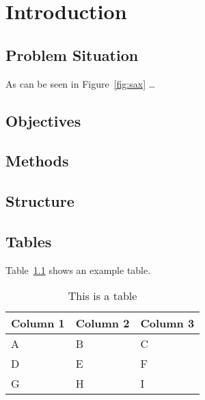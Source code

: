 \chapter{Introduction}

\blindtext \citet{Shearer2000}

\section{Problem Situation}

\blindtext


As can be seen in Figure~\ref{fig:sax} \ldots

\section{Objectives}

\blindtext

\section{Methods}

\blindtext

\section{Structure}

\blindtext

\section{Tables}

Table~\ref{tab:table-one} shows an example table.

\begin{table}[htbp]
    \centering
    \caption{This is a table}
    \label{tab:table-one}
    \begin{tabular}{lll}
        \addlinespace
        \toprule
        Column 1 & Column 2 & Column 3 \\
        \midrule
        A     & B     & C \\
        D     & E     & F \\
        G     & H     & I \\
        \bottomrule
    \end{tabular}
\end{table}

